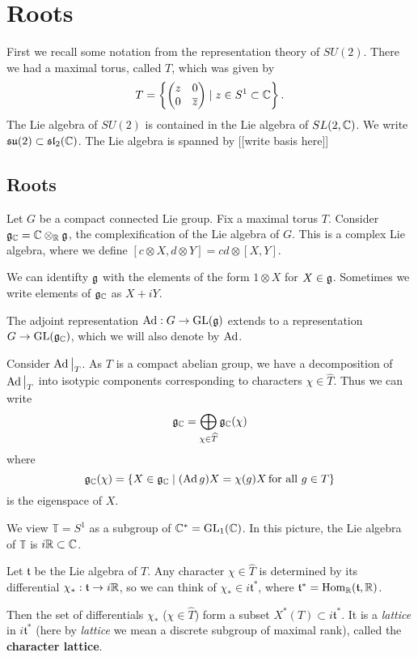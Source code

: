 \documentclass[11pt, english]{article}
\begin{document}
\newpage
\section{Roots}

First we recall some notation from the representation theory of $SU(2)$. There we had a maximal torus, called $T$, which was given by
$$
T = \left\{ \begin{pmatrix} z & 0 \\ 0 & \overline z
\end{pmatrix} \mid z \in S^1 \subset \mathbb{C} \right\}.
$$
The Lie algebra of $SU(2)$ is contained in the Lie algebra of $SL(2,\mathbb{C})$. We write $\mathfrak{su}(2) \subset \mathfrak{sl}_2(\mathbb{C})$. The Lie algebra is spanned by [[write basis here]]

\subsection{Roots}

Let $G$ be a compact connected Lie group. Fix a maximal torus $T$. Consider $\mathfrak g_{\mathbb{C}}=\mathbb{C} \otimes_{\mathbb{R}} \mathfrak g$, the complexification of the Lie algebra of $G$. This is a complex Lie algebra, where we define $[c \otimes X, d \otimes Y]=cd \otimes [X,Y]$.

We can identifty $\mathfrak g$ with the elements of the form $1 \otimes X$ for $X \in \mathfrak g$. Sometimes we write elements of $\mathfrak g_{\mathbb{C}}$ as $X+iY$.

The adjoint representation $\operatorname{Ad}:G \to \operatorname{GL}(\mathfrak g)$ extends to a representation $G \to \operatorname{GL}(\mathfrak g_{\mathbb{C}})$, which we will also denote by $\operatorname{Ad}$.

Consider $\restr{\Ad}{T}$. As $T$ is a compact abelian group, we have a decomposition of $\restr{\Ad}{T}$ into isotypic components corresponding to characters $\chi \in \widehat T$. Thus we can write
$$
\mathfrak g_{\mathbb{C}} = \bigoplus_{\chi \in \widehat T} \mathfrak g_{\mathbb{C}}(\chi)
$$
where
$$
\mathfrak g_{\mathbb{C}}(\chi) = \{ X \in \mathfrak g_{\mathbb{C}} \mid (\operatorname{Ad} g)X = \chi(g) X \, \text{for all } g \in T \}
$$
is the eigenspace of $X$.

We view $\mathbb T = S^1$ as a subgroup of $\mathbb{C}^\ast = \operatorname{GL}_1(\mathbb{C})$. In  this picture, the Lie algebra of $\mathbb T$ is $i \mathbb{R} \subset \mathbb{C}$.

Let $\mathfrak t$ be the Lie algebra of $T$. Any character $\chi \in \widehat T$ is determined by its differential $\chi_\ast:\mathfrak t \to i \mathbb{R}$, so we can think of $\chi_\ast \in i \mathfrak t^\ast$, where $\mathfrak t ^\ast = \operatorname{Hom}_{\mathbb{R}}(\mathfrak t,\mathbb{R})$.

Then the set of differentials $\chi_\ast$ ($\chi \in \widehat T$) form a subset $X^\ast(T) \subset i \mathfrak t ^\ast$. It is a \emph{lattice} in $i \mathfrak t^\ast$ (here by \emph{lattice} we mean a discrete subgroup of maximal rank), called the \textbf{character lattice}.
\end{document}
